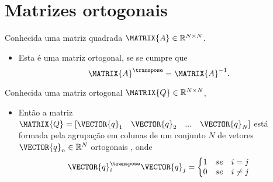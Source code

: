 \section{ Matrizes ortogonais}


\begin{definition}\label{def:ortogonalmatrix0}
Conhecida uma matriz quadrada $\MATRIX{A} \in \mathbb{R}^{N \times N}$. 
\begin{itemize}
\item Esta é uma matriz ortogonal, se se cumpre que \cite[pp. 66]{golub2013matrix}
\begin{equation}
\MATRIX{A}^{\transpose} = \MATRIX{A}^{-1}.
\end{equation}
\end{itemize}
\end{definition}

\begin{theorem}\label{theo:ortogonalmatrix0}
Conhecida uma matriz ortogonal $\MATRIX{Q} \in \mathbb{R}^{N \times N}$,
\begin{itemize}
\item Então a matriz $\MATRIX{Q}=\left[\VECTOR{q}_1\quad \VECTOR{q}_2\quad ... \quad \VECTOR{q}_N \right]$
está formada pela agrupação em colunas de um conjunto $N$ de vetores $\VECTOR{q}_n \in \mathbb{R}^{N}$
ortogonais \cite[pp. 66]{golub2013matrix}, onde 
\begin{equation}
\VECTOR{q}_i^{\transpose}\VECTOR{q}_j=
\left\{ 
\begin{matrix}
1 & se & i = j\\
0 & se & i \neq j
\end{matrix}
\right.
\end{equation} 
\end{itemize}
\end{theorem}

